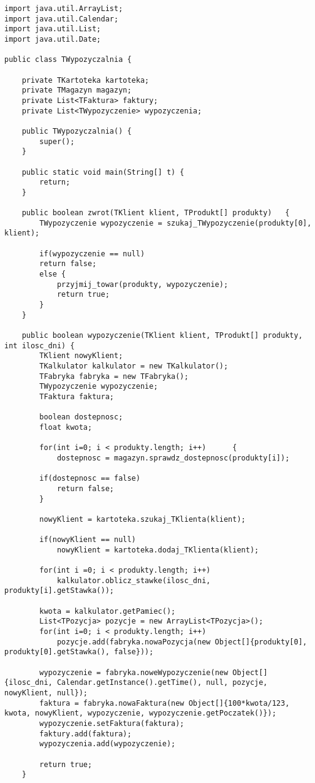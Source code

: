 \documentclass{article}
\begin{document}
\begin{verbatim}
import java.util.ArrayList;
import java.util.Calendar;
import java.util.List;
import java.util.Date;

public class TWypozyczalnia {
	
	private TKartoteka kartoteka;
	private TMagazyn magazyn;
	private List<TFaktura> faktury;
	private List<TWypozyczenie> wypozyczenia;
	
	public TWypozyczalnia()	{
		super();
	}
	
	public static void main(String[] t)	{
		return;
	}
	
	public boolean zwrot(TKlient klient, TProdukt[] produkty)	{
		TWypozyczenie wypozyczenie = szukaj_TWypozyczenie(produkty[0], klient);
		
		if(wypozyczenie == null)
		return false;
		else {
			przyjmij_towar(produkty, wypozyczenie);
			return true;
		}
	}
	
	public boolean wypozyczenie(TKlient klient, TProdukt[] produkty, int ilosc_dni)	{
		TKlient nowyKlient;
		TKalkulator kalkulator = new TKalkulator(); 
		TFabryka fabryka = new TFabryka();
		TWypozyczenie wypozyczenie;
		TFaktura faktura;
		
		boolean dostepnosc;
		float kwota;
		
		for(int i=0; i < produkty.length; i++)		{
			dostepnosc = magazyn.sprawdz_dostepnosc(produkty[i]);
			
		if(dostepnosc == false) 
			return false;
		}
		
		nowyKlient = kartoteka.szukaj_TKlienta(klient);    
		
		if(nowyKlient == null)
			nowyKlient = kartoteka.dodaj_TKlienta(klient);
		
		for(int i =0; i < produkty.length; i++)
			kalkulator.oblicz_stawke(ilosc_dni, produkty[i].getStawka());
		
		kwota = kalkulator.getPamiec();
		List<TPozycja> pozycje = new ArrayList<TPozycja>();
		for(int i=0; i < produkty.length; i++)
			pozycje.add(fabryka.nowaPozycja(new Object[]{produkty[0], produkty[0].getStawka(), false}));
				
		wypozyczenie = fabryka.noweWypozyczenie(new Object[]{ilosc_dni, Calendar.getInstance().getTime(), null, pozycje, nowyKlient, null});
		faktura = fabryka.nowaFaktura(new Object[]{100*kwota/123, kwota, nowyKlient, wypozyczenie, wypozyczenie.getPoczatek()});
		wypozyczenie.setFaktura(faktura);
		faktury.add(faktura);
		wypozyczenia.add(wypozyczenie);
		
		return true;
	}
	

\end{verbatim}
\end{document}
